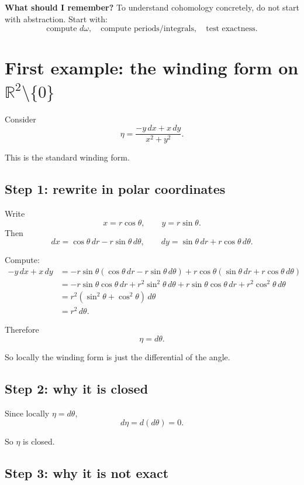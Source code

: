 \documentclass[11pt]{article}
\newenvironment{remember}
{\begin{framed}\noindent\textbf{What should I remember? }}
{\end{framed}}
\begin{document}
\begin{remember}
To understand cohomology concretely, do not start with abstraction. Start with:
\[
\text{compute } d\omega,\quad \text{compute periods/integrals},\quad \text{test exactness.}
\]
\end{remember}

\section{First example: the winding form on \(\mathbb{R}^2\setminus\{0\}\)}

Consider
\[
\eta=\frac{-y\,dx+x\,dy}{x^2+y^2}.
\]

This is the standard winding form.

\subsection{Step 1: rewrite in polar coordinates}

Write
\[
x=r\cos\theta,\qquad y=r\sin\theta.
\]
Then
\[
dx=\cos\theta\,dr-r\sin\theta\,d\theta,
\qquad
dy=\sin\theta\,dr+r\cos\theta\,d\theta.
\]

Compute:
\begin{align*}
-y\,dx+x\,dy
&=
-r\sin\theta(\cos\theta\,dr-r\sin\theta\,d\theta)
+r\cos\theta(\sin\theta\,dr+r\cos\theta\,d\theta)\\
&=
-r\sin\theta\cos\theta\,dr+r^2\sin^2\theta\,d\theta
+r\sin\theta\cos\theta\,dr+r^2\cos^2\theta\,d\theta\\
&=
r^2(\sin^2\theta+\cos^2\theta)\,d\theta\\
&=
r^2\,d\theta.
\end{align*}

Therefore
\[
\eta=d\theta.
\]

So locally the winding form is just the differential of the angle.

\subsection{Step 2: why it is closed}

Since locally \(\eta=d\theta\),
\[
d\eta=d(d\theta)=0.
\]

So \(\eta\) is closed.

\subsection{Step 3: why it is not exact}
\end{document}

